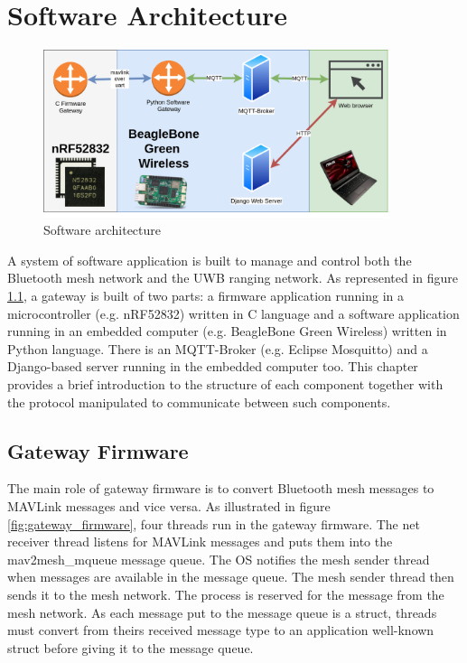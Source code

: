 \documentclass[\main/main.tex]{subfiles}
\begin{document}
\graphicspath{{img/}{05_software/img/}}

\chapter{Software Architecture}
\begin{figure}[H]
    \begin{center}
        \includegraphics[width=0.9\textwidth]{software_architecture.png}
    \end{center}
    \caption{Software architecture}
    \label{fig:software_architecture}
\end{figure}
A system of software application is built to manage and control both the Bluetooth mesh network and the UWB ranging network. As represented in figure \ref{fig:software_architecture}, a gateway is built of two parts: a firmware application running in a microcontroller (e.g. nRF52832) written in C language and a software application running in an embedded computer (e.g. BeagleBone Green Wireless) written in Python language. There is an  MQTT-Broker (e.g. Eclipse Mosquitto) and a Django-based server running in the embedded computer too. This chapter provides a brief introduction to the structure of each component together with  the protocol manipulated to communicate between such components.

\section{Gateway Firmware}
The main role of gateway firmware is to convert Bluetooth mesh messages to MAVLink messages and vice versa. As illustrated in figure \ref{fig:gateway_firmware}, four threads run in the gateway firmware. The net receiver thread listens for MAVLink messages and puts them into the mav2mesh\_mqueue message queue. The OS notifies the mesh sender thread when messages are available in the message queue. The mesh sender thread then sends it to the mesh network. The process is reserved for the message from the mesh network. As each message put to the message queue is a struct, threads must convert from theirs received message type to an application well-known struct before giving it to the message queue.
\end{document}
